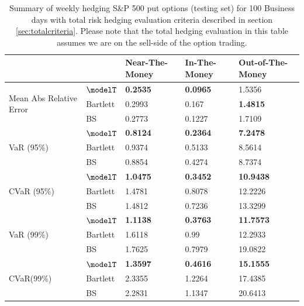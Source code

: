\begin{table}[htp!]
	\centering
	\begin{tabular}{ll|l|l|l|}
		\cline{3-5}
		&          & Near-The-Money   & In-The-Money     & Out-of-The-Money  \\ \hline
		\multicolumn{1}{|l|}{\multirow{3}{*}{Mean Abs Relative Error}} & $\modelT$    & \textbf{0.2535}           & \textbf{0.0965}  & 1.5356   \\ 
		\multicolumn{1}{|l|}{}                                & Bartlett     & 0.2993 			& 0.167  		   & \textbf{1.4815}       \\ 
		\multicolumn{1}{|l|}{}                                & BS       	 & 0.2773 		    & 0.1227 		   & 1.7109            \\ 
		\hline
		\multicolumn{1}{|l|}{\multirow{3}{*}{VaR (95\%)}}     & $\modelT$    & \textbf{0.8124} & \textbf{0.2364} & \textbf{7.2478}  \\ 
		\multicolumn{1}{|l|}{}                                & Bartlett 	 & 0.9374 			& 0.5133 		   &8.5614           \\  
		\multicolumn{1}{|l|}{}                                & BS       	 & 0.8854 			& 0.4274 		   &8.7374           \\ 
		\hline
		\multicolumn{1}{|l|}{\multirow{3}{*}{CVaR (95\%)}}    & $\modelT$    & \textbf{1.0475} & \textbf{0.3452} & \textbf{10.9438} \\ 
		\multicolumn{1}{|l|}{}                                & Bartlett 	 & 1.4781  		&0.8078 		   &12.2226          \\  
		\multicolumn{1}{|l|}{}                                & BS       	 &  1.4812  		&0.7236 		   &13.3299          \\ 
		\hline
		\multicolumn{1}{|l|}{\multirow{3}{*}{VaR (99\%)}}     & $\modelT$    & \textbf{1.1138} & \textbf{0.3763} & \textbf{11.7573} \\  
		\multicolumn{1}{|l|}{}                                & Bartlett 	 & 1.6118  		 &0.99   		   &12.2933         \\  
		\multicolumn{1}{|l|}{}                                & BS       	 & 1.7625  		&0.7979 		   &19.0822          \\ 
		\hline
		\multicolumn{1}{|l|}{\multirow{3}{*}{CVaR(99\%)}}     & $\modelT$    & \textbf{1.3597} & \textbf{0.4616} & \textbf{15.1555} \\  
		\multicolumn{1}{|l|}{}                                & Bartlett     &2.3355  			&1.2264 		   &17.4385          \\ 
		\multicolumn{1}{|l|}{}                                & BS       	 & 2.2831  		&1.1347 		   &20.6413          \\ \hline
	\end{tabular}
	\caption{Summary of weekly hedging S\&P 500 put options (testing set) for 100 Business days with total risk hedging evaluation criteria described in section \ref{sec:totalcriteria}. Please note that the total hedging evaluation in this table assumes we are on the sell-side of the option trading.} \label{table:putTotalW}
\end{table}
